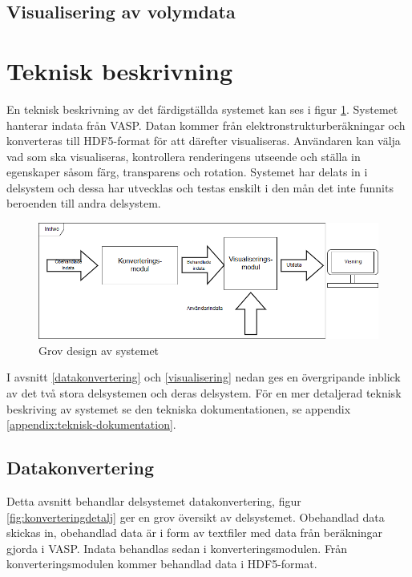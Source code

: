 \documentclass[a4paper,12pt]{article}
\begin{document}
\subsection{Visualisering av volymdata}

\section{Teknisk beskrivning}
\label{ch:teknisk-beskrivning}

En teknisk beskrivning av det  färdigställda systemet kan ses i figur \ref{fig:grov-skiss}. %
Systemet hanterar indata från VASP. %
Datan kommer från elektronstrukturberäkningar och konverteras till HDF5-format för att därefter visualiseras. Användaren kan välja vad som ska visualiseras, kontrollera renderingens utseende och ställa in egenskaper såsom färg, transparens och rotation.
Systemet har delats in i delsystem och dessa har utvecklas och testas enskilt i den mån det inte funnits beroenden till andra delsystem.

\begin{figure}[H]
	\centering
	\includegraphics[scale=0.55]{grov-skiss.png}
	\caption{Grov design av systemet}
	\label{fig:grov-skiss}
\end{figure}

I avsnitt \ref{datakonvertering} och \ref{visualisering} nedan ges en övergripande inblick av det två stora delsystemen och deras delsystem. För en mer detaljerad teknisk beskriving av systemet se den tekniska dokumentationen, se appendix \ref{appendix:teknisk-dokumentation}.

\subsection{Datakonvertering}
\label{ch:datakonvertering}
Detta avsnitt behandlar delsystemet datakonvertering, figur \ref{fig:konverteringdetalj} ger en grov översikt av delsystemet. Obehandlad data skickas in, obehandlad data är i form av textfiler med data från beräkningar gjorda i VASP.%
Indata behandlas sedan i konverteringsmodulen. Från konverteringsmodulen kommer behandlad data i HDF5-format.
\end{document}

